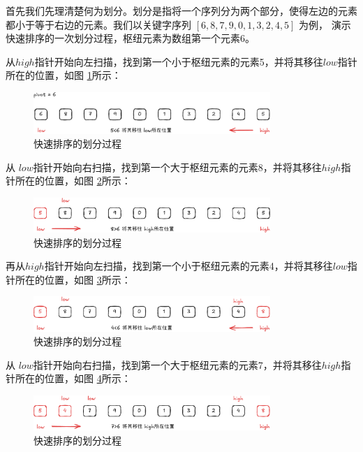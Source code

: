 \documentclass[lang=cn,newtx,10pt,scheme=chinese]{../elegantbook}
\begin{document}
首先我们先理清楚何为划分。划分是指将一个序列分为两个部分，使得左边的元素都小于等于右边的元素。我们以关键字序列 $[6,8,7,9,0,1,3,2,4,5]$ 为例，
演示快速排序的一次划分过程，枢纽元素为数组第一个元素6。

从$high$指针开始向左扫描，找到第一个小于枢纽元素的元素5，并将其移往$low$指针所在的位置，如图 \ref{fig:patition_a}所示：

\begin{figure}[h!]
    \centering
    \includegraphics[width=0.8\textwidth]{./figure/pdf/cropped/patition_a.pdf}
    \caption{快速排序的划分过程}
    \label{fig:patition_a}

\end{figure}

从 $low$指针开始向右扫描，找到第一个大于枢纽元素的元素8，并将其移往$high$指针所在的位置，如图 \ref{fig:patition_b}所示：

\begin{figure}[h!]
    \centering
    \includegraphics[width=0.8\textwidth]{./figure/pdf/cropped/patition_b.pdf}
    \caption{快速排序的划分过程}
    \label{fig:patition_b}

    \end{figure}

再从$high$指针开始向左扫描，找到第一个小于枢纽元素的元素4，并将其移往$low$指针所在的位置，如图 \ref{fig:patition_c}所示：

\begin{figure}[h!]
    \centering
    \includegraphics[width=0.8\textwidth]{./figure/pdf/cropped/patition_c.pdf}
    \caption{快速排序的划分过程}
    \label{fig:patition_c}
\end{figure}

从 $low$指针开始向右扫描，找到第一个大于枢纽元素的元素7，并将其移往$high$指针所在的位置，如图 \ref{fig:patition_d}所示：

\begin{figure}
[h!]
    \centering
    \includegraphics[width=0.8\textwidth]{./figure/pdf/cropped/patition_d.pdf}
    \caption{快速排序的划分过程}
    \label{fig:patition_d}
\end{figure}
\end{document}
